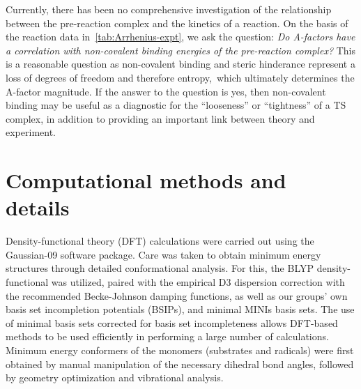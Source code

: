 Currently, there has been no comprehensive investigation of the relationship
between the pre-reaction complex and the kinetics of a reaction. On the basis of
the reaction data in~\ref{tab:Arrhenius-expt}, we ask the question: \emph{Do
A-factors have a correlation with non-covalent binding energies of the
pre-reaction complex?} This is a reasonable question as non-covalent binding and
steric hinderance represent a loss of degrees of freedom and therefore
entropy,\footnotemark\ which ultimately determines the A-factor magnitude. If
the answer to the question is yes, then non-covalent binding may be useful as a
diagnostic for the ``looseness'' or ``tightness'' of a TS complex, in addition
to providing an important link between theory and experiment.



\section{Computational methods and details}

Density-functional theory (DFT) calculations were carried out using the
Gaussian-09 software package.\cite{Frisch2009} Care was taken to obtain minimum
energy structures through detailed conformational analysis. For this, the BLYP
density-functional\cite{Becke1988,Lee1988} was utilized, paired with the
empirical D3 dispersion correction\cite{Grimme2010} with the recommended
Becke-Johnson damping functions,\cite{Johnson2006} as well as our groups' own
basis set incompletion potentials (BSIPs),\cite{OterodelaRoza2017ACP} and
minimal MINIs basis sets.\cite{Huzinaga1984} The use of minimal basis sets
corrected for basis set incompleteness allows DFT-based methods to be used
efficiently in performing a large number of calculations. Minimum energy
conformers of the monomers (substrates and radicals) were first obtained by
manual manipulation of the necessary dihedral bond angles, followed by geometry
optimization and vibrational analysis.

